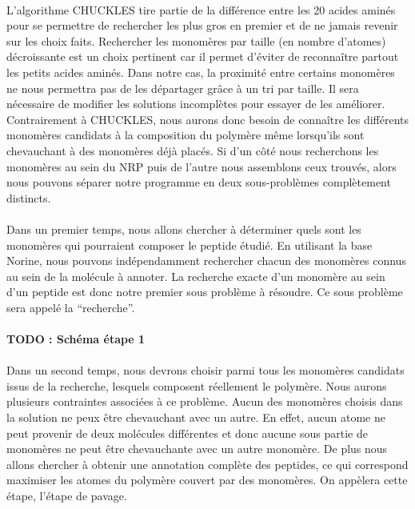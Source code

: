 \documentclass[12pt,french,twoside]{report}
\begin{document}
\paragraph{}L'algorithme CHUCKLES tire partie de la différence entre les 20 acides aminés pour se permettre de rechercher les plus gros en premier et de ne jamais revenir sur les choix faits.
Rechercher les monomères par taille (en nombre d'atomes) décroissante est un choix pertinent car il permet d'éviter de reconnaître partout les petits acides aminés.
Dans notre cas, la proximité entre certains monomères ne nous permettra pas de les départager grâce à un tri par taille.
Il sera nécessaire de modifier les solutions incomplètes pour essayer de les améliorer.
Contrairement à CHUCKLES, nous aurons donc besoin de connaître les différents monomères candidats à la composition du polymère même lorsqu'ils sont chevauchant à des monomères déjà placés.
Si d'un côté nous recherchons les monomères au sein du NRP puis de l'autre nous assemblons ceux trouvés, alors nous pouvons séparer notre programme en deux sous-problèmes complètement distincts.

\paragraph{}Dans un premier temps, nous allons chercher à déterminer quels sont les monomères qui pourraient composer le peptide étudié.
En utilisant la base Norine, nous pouvons indépendamment rechercher chacun des monomères connus au sein de la molécule à annoter.
La recherche exacte d'un monomère au sein d'un peptide est donc notre premier sous problème à résoudre.
Ce sous problème sera appelé la ``recherche''.

\paragraph{TODO : Schéma étape 1}

\paragraph{}Dans un second temps, nous devrons choisir parmi tous les monomères candidats issus de la recherche, lesquels composent réellement le polymère.
Nous aurons plusieurs contraintes associées à ce problème.
Aucun des monomères choisis dans la solution ne peux être chevauchant avec un autre.
En effet, aucun atome ne peut provenir de deux molécules différentes et donc aucune sous partie de monomères ne peut être chevauchante avec un autre monomère.
De plus nous allons chercher à obtenir une annotation complète des peptides, ce qui correspond maximiser les atomes du polymère couvert par des monomères.
On appèlera cette étape, l'étape de pavage.
\end{document}
